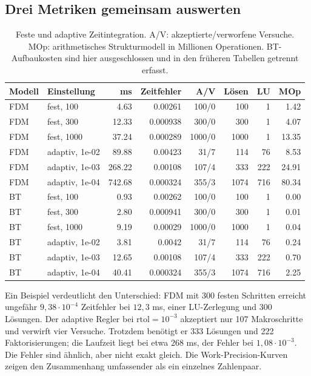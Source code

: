 \documentclass[11pt,a4paper]{article}
\begin{document}
\subsection{Drei Metriken gemeinsam auswerten}
\begin{table}[htbp]\centering\small
\caption{Feste und adaptive Zeitintegration. A/V: akzeptierte/verworfene Versuche. MOp: arithmetisches Strukturmodell in Millionen Operationen. BT-Aufbaukosten sind hier ausgeschlossen und in den früheren Tabellen getrennt erfasst.}
\begin{tabular}{llrrrrrr}\toprule
Modell & Einstellung & ms & Zeitfehler & A/V & Lösen & LU & MOp\\\midrule
FDM & fest, 100 & 4.63 & 0.00261 & 100/0 & 100 & 1 & 1.42 \\
FDM & fest, 300 & 12.33 & 0.000938 & 300/0 & 300 & 1 & 4.07 \\
FDM & fest, 1000 & 37.24 & 0.000289 & 1000/0 & 1000 & 1 & 13.35 \\
FDM & adaptiv, 1e-02 & 89.88 & 0.00423 & 31/7 & 114 & 76 & 8.53 \\
FDM & adaptiv, 1e-03 & 268.22 & 0.00108 & 107/4 & 333 & 222 & 24.91 \\
FDM & adaptiv, 1e-04 & 742.68 & 0.000324 & 355/3 & 1074 & 716 & 80.34 \\
BT & fest, 100 & 0.93 & 0.00262 & 100/0 & 100 & 1 & 0.00 \\
BT & fest, 300 & 2.80 & 0.000941 & 300/0 & 300 & 1 & 0.01 \\
BT & fest, 1000 & 9.19 & 0.00029 & 1000/0 & 1000 & 1 & 0.04 \\
BT & adaptiv, 1e-02 & 3.81 & 0.0042 & 31/7 & 114 & 76 & 0.24 \\
BT & adaptiv, 1e-03 & 12.65 & 0.00108 & 107/4 & 333 & 222 & 0.70 \\
BT & adaptiv, 1e-04 & 40.41 & 0.000324 & 355/3 & 1074 & 716 & 2.25 \\

\bottomrule\end{tabular}
\end{table}

Ein Beispiel verdeutlicht den Unterschied: FDM mit 300 festen Schritten erreicht ungefähr $9{,}38\cdot10^{-4}$ Zeitfehler bei $12{,}3$ ms, einer LU-Zerlegung und 300 Lösungen. Der adaptive Regler bei $\mathrm{rtol}=10^{-3}$ akzeptiert nur 107 Makroschritte und verwirft vier Versuche. Trotzdem benötigt er 333 Lösungen und 222 Faktorisierungen; die Laufzeit liegt bei etwa $268$ ms, der Fehler bei $1{,}08\cdot10^{-3}$. Die Fehler sind ähnlich, aber nicht exakt gleich. Die Work-Precision-Kurven zeigen den Zusammenhang umfassender als ein einzelnes Zahlenpaar.
\end{document}
